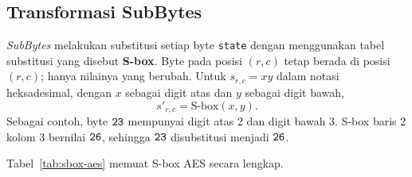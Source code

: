 \subsection{Transformasi SubBytes}

\textit{SubBytes} melakukan substitusi setiap byte \texttt{state} dengan
menggunakan tabel substitusi yang disebut \textbf{S-box}. Byte pada posisi
$(r,c)$ tetap berada di posisi $(r,c)$; hanya nilainya yang berubah. Untuk
$s_{r,c} = xy$ dalam notasi heksadesimal, dengan $x$ sebagai digit atas dan $y$
sebagai digit bawah,
\begin{equation}
s'_{r,c} = \text{S-box}(x, y).
\label{eq:aes-subbytes}
\end{equation}
Sebagai contoh, byte $\texttt{23}$ mempunyai digit atas 2 dan digit bawah 3.
S-box baris 2 kolom 3 bernilai $\texttt{26}$, sehingga $\texttt{23}$ disubstitusi
menjadi $\texttt{26}$.

Tabel~\ref{tab:sbox-aes} memuat S-box AES secara lengkap.

